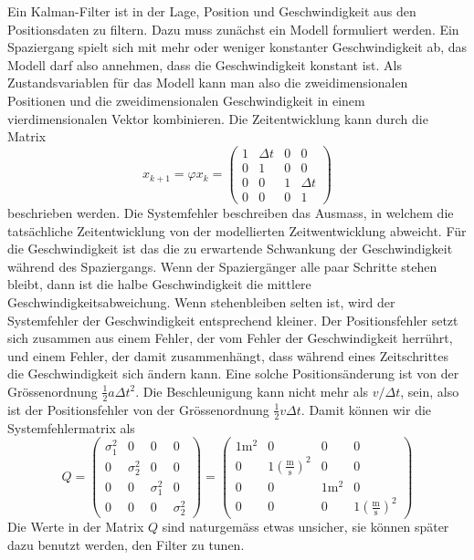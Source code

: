 \begin{loesung}
Ein Kalman-Filter ist in der Lage, Position und Geschwindigkeit aus
den Positionsdaten zu filtern. Dazu muss zunächst ein Modell formuliert
werden. Ein Spaziergang spielt sich mit mehr oder weniger konstanter
Geschwindigkeit ab, das Modell darf also annehmen, dass die Geschwindigkeit
konstant ist. Als Zustandsvariablen für das Modell kann man also die
zweidimensionalen Positionen und die zweidimensionalen Geschwindigkeit
in einem vierdimensionalen Vektor kombinieren.
Die Zeitentwicklung kann durch die Matrix
\begin{equation}
x_{k+1}=\varphi x_k=
\begin{pmatrix}
1&\Delta t & 0 & 0       \\
0&    1    & 0 & 0       \\
0&    0    & 1 & \Delta t\\
0&    0    & 0 & 1
\end{pmatrix}
\end{equation}
beschrieben werden. Die Systemfehler beschreiben das Ausmass, in
welchem die tatsächliche Zeitentwicklung von der modellierten
Zeitwentwicklung abweicht.
Für die Geschwindigkeit ist das die zu erwartende Schwankung der
Geschwindigkeit während des Spaziergangs. Wenn der Spaziergänger
alle paar Schritte stehen bleibt, dann ist die halbe Geschwindigkeit
die mittlere Geschwindigkeitsabweichung. Wenn stehenbleiben selten
ist, wird der Systemfehler der Geschwindigkeit entsprechend kleiner.
Der Positionsfehler setzt sich zusammen aus einem Fehler, der vom
Fehler der Geschwindigkeit herrührt, und einem Fehler, der damit
zusammenhängt, dass während eines Zeitschrittes die Geschwindigkeit
sich ändern kann. Eine solche Positionsänderung ist von
der Grössenordnung $\frac12a\Delta t^2$. Die Beschleunigung kann nicht
mehr als $v/\Delta t$, sein, also ist der Positionsfehler von der
Grössenordnung $\frac12v \Delta t$. Damit können wir die Systemfehlermatrix
als
\[
Q=
\begin{pmatrix}
\sigma_1^2&0&0&0\\
0&\sigma_2^2&0&0\\
0&0&\sigma_1^2&0\\
0&0&0&\sigma_2^2
\end{pmatrix}
=
\begin{pmatrix}
1\text{m}^2&0&0&0\\
0&1\left(\frac{\text{m}}{\text{s}}\right)^2&0&0\\
0&0&1\text{m}^2&0\\
0&0&0&1\left(\frac{\text{m}}{\text{s}}\right)^2
\end{pmatrix}
\]
Die Werte in der Matrix $Q$ sind naturgemäss etwas unsicher, sie können
später dazu benutzt werden, den Filter zu tunen.


\end{loesung}
